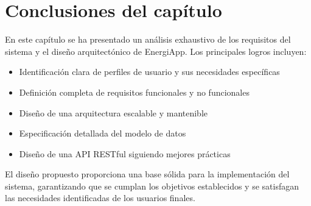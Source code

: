 \section{Conclusiones del capítulo}

En este capítulo se ha presentado un análisis exhaustivo de los requisitos del sistema y el diseño arquitectónico de EnergiApp. Los principales logros incluyen:

\begin{itemize}
    \item Identificación clara de perfiles de usuario y sus necesidades específicas
    \item Definición completa de requisitos funcionales y no funcionales
    \item Diseño de una arquitectura escalable y mantenible
    \item Especificación detallada del modelo de datos
    \item Diseño de una API RESTful siguiendo mejores prácticas
\end{itemize}

El diseño propuesto proporciona una base sólida para la implementación del sistema, garantizando que se cumplan los objetivos establecidos y se satisfagan las necesidades identificadas de los usuarios finales.
